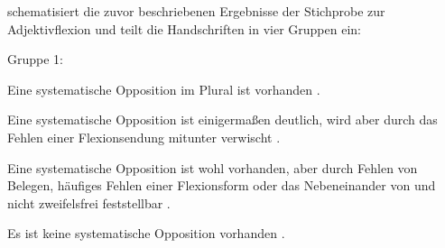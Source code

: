  schematisiert die zuvor beschriebenen Ergebnisse der
Stichprobe zur Adjektivflexion und teilt die Handschriften in vier Gruppen ein:

\begin{labeling}{Gruppe 1:}
	\item[Gruppe 1:] Eine systematische Opposition im Plural ist vorhanden
	\autocites{kc:A1}{kc:B1}.

	\item[Gruppe 2:] Eine systematische Opposition ist einigermaßen deutlich,
	wird aber durch das Fehlen einer Flexionsendung mitunter verwischt
	\autocites{kc:C1}.

	\item[Gruppe 3:] Eine systematische Opposition ist wohl vorhanden, aber
	durch Fehlen von Belegen, häufiges Fehlen einer Flexionsform oder das
	Nebeneinander von  und  nicht zweifelsfrei feststellbar
	\autocites{kc:M}{kc:VB}{kc:K}.

	\item[Gruppe 4:] Es ist keine systematische Opposition vorhanden
	\autocites{kc:H}{kc:P}{kc:Z}.
\end{labeling}

